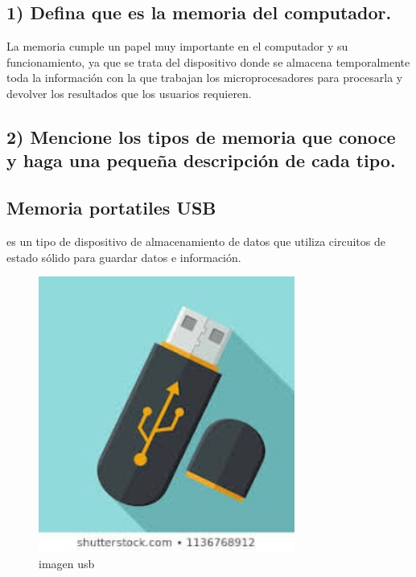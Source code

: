 \documentclass{article}
\begin{document}
\subsection*{1) Defina que es la memoria del computador.}
La memoria cumple un papel muy importante en el computador y su funcionamiento, ya que se trata del dispositivo donde se almacena temporalmente toda la información con la que trabajan los microprocesadores para procesarla y devolver los resultados que los usuarios requieren.\\[0.5cm]
 \subsection*{2) Mencione los tipos de memoria que conoce y haga una pequeña descripción de cada tipo.}
\subsection*{Memoria portatiles USB}
es un tipo de dispositivo de almacenamiento de datos que utiliza circuitos de estado sólido para guardar datos e información.
\begin{figure}[h!]
    \centering
    \includegraphics[width=0.75\textwidth]{usb.jpg}
    \caption{imagen usb}
    \label{fig:my_label}
\end{figure}
\end{document}
